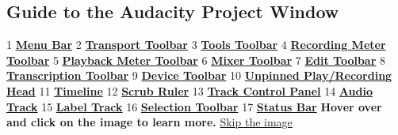 \begin{multicols}{2}
\subsection{Guide to the Audacity Project Window}
\label{index:reference}1\textbf{
\hyperref[\foo{man:menu:reference:}]{Menu Bar}
}2\textbf{
\hyperref[\foo{man:transport:toolbar:}]{Transport Toolbar}
}3\textbf{
\hyperref[\foo{man:tools:toolbar:}]{Tools Toolbar}
}4\textbf{
\hyperref[\foo{man:meter:toolbar:recording}]{Recording Meter Toolbar}
}5\textbf{
\hyperref[\foo{man:meter:toolbar:playback}]{Playback Meter Toolbar}
}6\textbf{
\hyperref[\foo{man:mixer:toolbar:}]{Mixer Toolbar}
}7\textbf{
\hyperref[\foo{man:edit:toolbar:}]{Edit Toolbar}
}8\textbf{
\hyperref[\foo{man:transcription:toolbar:}]{Transcription Toolbar}
}9\textbf{
\hyperref[\foo{man:device:toolbar:}]{Device Toolbar}
}10\textbf{
\hyperref[\foo{man:timeline:pinned}]{Unpinned Play/Recording Head}
}11\textbf{
\hyperref[\foo{man:timeline:}]{Timeline}
}12\textbf{
\hyperref[\foo{man:scrubbing:and:seeking:scrubbing}]{Scrub Ruler}
}13\textbf{
\hyperref[\foo{man:track:control:panel:and:vertical:scale:}]{Track Control Panel}
}14\textbf{
\hyperref[\foo{man:audio:tracks:}]{Audio Track}
}15\textbf{
\hyperref[\foo{man:label:tracks:}]{Label Track}
}16\textbf{
\hyperref[\foo{man:selection:toolbar:}]{Selection Toolbar}
}17\textbf{
\hyperref[\foo{man:status:bar:}]{Status Bar}
}\textbf{Hover over and click on the image to learn more.}
\hyperref[\foo{index::skiptheimage}]{Skip the image}



\end{multicols}
